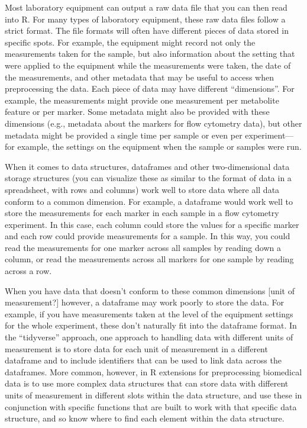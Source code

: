 \documentclass[]{tufte-book}
\begin{document}
Most laboratory equipment can output a raw data file that you can then read into R.
For many types of laboratory equipment, these raw data files follow a strict format.
The file formats will often have different pieces of data stored in specific spots.
For example, the equipment might record not only the measurements taken for the
sample, but also information about the setting that were applied to the equipment
while the measurements were taken, the date of the measurements, and other metadata
that may be useful to access when preprocessing the data. Each piece of data may
have different ``dimensions''. For example, the measurements might provide one
measurement per metabolite feature or per marker. Some metadata might also be
provided with these dimensions (e.g., metadata about the markers for flow
cytometry data), but other metadata might be provided a single time per sample
or even per experiment---for example, the settings on the equipment when the
sample or samples were run.

When it comes to data structures, dataframes and other two-dimensional data storage
structures (you can visualize these as similar to the format of data in a spreadsheet,
with rows and columns) work well to store data where all data conform to a common
dimension. For example, a dataframe would work well to store the measurements
for each marker in each sample in a flow cytometry experiment. In this case,
each column could store the values for a specific marker and each row could
provide measurements for a sample. In this way, you could read the measurements
for one marker across all samples by reading down a column, or read the measurements
across all markers for one sample by reading across a row.

When you have data that doesn't conform to these common dimensions {[}unit of
measurement?{]} however, a dataframe may work poorly to store the data. For
example, if you have measurements taken at the level of the equipment settings
for the whole experiment, these don't naturally fit into the dataframe format.
In the ``tidyverse'' approach, one approach to handling data with different units
of measurement is to store data for each unit of measurement in a different
dataframe and to include identifiers that can be used to link data across the
dataframes. More common, however, in R extensions for preprocessing biomedical
data is to use more complex data structures that can store data with different
units of measurement in different slots within the data structure, and use these
in conjunction with specific functions that are built to work with that specific
data structure, and so know where to find each element within the data
structure.
\end{document}
